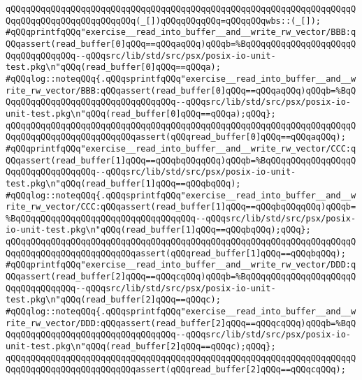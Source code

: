 \newline
\verb|qQQqqQQqqQQqqQQqqQQqqQQqqQQqqQQqqQQqqQQqqQQqqQQqqQQqqQQqqQQqqQQqqQQqqQQqqQQqqQQqqQQqqQQqqQQqqQQq(_[])qQQqqQQqqQQq=qQQqqQQqwbs::(_[]);|\newline
\newline
\verb|#qQQqprintfqQQq"exercise__read_into_buffer__and__write_rw_vector/BBB:qQQqassert(read_buffer[0]qQQq==qQQqaqQQq)qQQqb=%BqQQqqQQqqQQqqQQqqQQqqQQqqQQqqQQqqQQq--qQQqsrc/lib/std/src/psx/posix-io-unit-test.pkg\n"qQQq(read_buffer[0]qQQq==qQQqa);|\newline
\verb|#qQQqlog::noteqQQq{.qQQqsprintfqQQq"exercise__read_into_buffer__and__write_rw_vector/BBB:qQQqassert(read_buffer[0]qQQq==qQQqaqQQq)qQQqb=%BqQQqqQQqqQQqqQQqqQQqqQQqqQQqqQQqqQQq--qQQqsrc/lib/std/src/psx/posix-io-unit-test.pkg\n"qQQq(read_buffer[0]qQQq==qQQqa);qQQq};|\newline
\verb|qQQqqQQqqQQqqQQqqQQqqQQqqQQqqQQqqQQqqQQqqQQqqQQqqQQqqQQqqQQqqQQqqQQqqQQqqQQqqQQqqQQqqQQqqQQqqQQqassert(qQQqread_buffer[0]qQQq==qQQqaqQQq);|\newline
\verb|#qQQqprintfqQQq"exercise__read_into_buffer__and__write_rw_vector/CCC:qQQqassert(read_buffer[1]qQQq==qQQqbqQQqqQQq)qQQqb=%BqQQqqQQqqQQqqQQqqQQqqQQqqQQqqQQqqQQq--qQQqsrc/lib/std/src/psx/posix-io-unit-test.pkg\n"qQQq(read_buffer[1]qQQq==qQQqbqQQq);|\newline
\verb|#qQQqlog::noteqQQq{.qQQqsprintfqQQq"exercise__read_into_buffer__and__write_rw_vector/CCC:qQQqassert(read_buffer[1]qQQq==qQQqbqQQqqQQq)qQQqb=%BqQQqqQQqqQQqqQQqqQQqqQQqqQQqqQQqqQQq--qQQqsrc/lib/std/src/psx/posix-io-unit-test.pkg\n"qQQq(read_buffer[1]qQQq==qQQqbqQQq);qQQq};|\newline
\verb|qQQqqQQqqQQqqQQqqQQqqQQqqQQqqQQqqQQqqQQqqQQqqQQqqQQqqQQqqQQqqQQqqQQqqQQqqQQqqQQqqQQqqQQqqQQqqQQqassert(qQQqread_buffer[1]qQQq==qQQqbqQQq);|\newline
\verb|#qQQqprintfqQQq"exercise__read_into_buffer__and__write_rw_vector/DDD:qQQqassert(read_buffer[2]qQQq==qQQqcqQQq)qQQqb=%BqQQqqQQqqQQqqQQqqQQqqQQqqQQqqQQqqQQq--qQQqsrc/lib/std/src/psx/posix-io-unit-test.pkg\n"qQQq(read_buffer[2]qQQq==qQQqc);|\newline
\verb|#qQQqlog::noteqQQq{.qQQqsprintfqQQq"exercise__read_into_buffer__and__write_rw_vector/DDD:qQQqassert(read_buffer[2]qQQq==qQQqcqQQq)qQQqb=%BqQQqqQQqqQQqqQQqqQQqqQQqqQQqqQQqqQQq--qQQqsrc/lib/std/src/psx/posix-io-unit-test.pkg\n"qQQq(read_buffer[2]qQQq==qQQqc);qQQq};|\newline
\verb|qQQqqQQqqQQqqQQqqQQqqQQqqQQqqQQqqQQqqQQqqQQqqQQqqQQqqQQqqQQqqQQqqQQqqQQqqQQqqQQqqQQqqQQqqQQqqQQqassert(qQQqread_buffer[2]qQQq==qQQqcqQQq);|\newline
